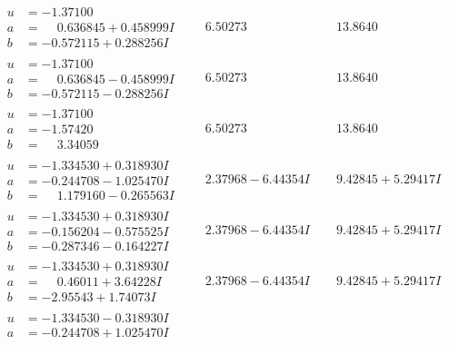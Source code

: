 \documentclass[1p]{elsarticle_modified}
\theoremstyle{definition}
\begin{document}
$$\begin{array}{c|c|c}
\begin{aligned}
u &= -1.37100\phantom{ +0.000000I} \\
a &= \phantom{-}0.636845 + 0.458999 I \\
b &= -0.572115 + 0.288256 I\end{aligned}
 & \phantom{-}6.50273\phantom{ +0.000000I} & \phantom{-}13.8640\phantom{ +0.000000I} \\ \hline\begin{aligned}
u &= -1.37100\phantom{ +0.000000I} \\
a &= \phantom{-}0.636845 - 0.458999 I \\
b &= -0.572115 - 0.288256 I\end{aligned}
 & \phantom{-}6.50273\phantom{ +0.000000I} & \phantom{-}13.8640\phantom{ +0.000000I} \\ \hline\begin{aligned}
u &= -1.37100\phantom{ +0.000000I} \\
a &= -1.57420\phantom{ +0.000000I} \\
b &= \phantom{-}3.34059\phantom{ +0.000000I}\end{aligned}
 & \phantom{-}6.50273\phantom{ +0.000000I} & \phantom{-}13.8640\phantom{ +0.000000I} \\ \hline\begin{aligned}
u &= -1.334530 + 0.318930 I \\
a &= -0.244708 - 1.025470 I \\
b &= \phantom{-}1.179160 - 0.265563 I\end{aligned}
 & \phantom{-}2.37968 - 6.44354 I & \phantom{-}9.42845 + 5.29417 I \\ \hline\begin{aligned}
u &= -1.334530 + 0.318930 I \\
a &= -0.156204 - 0.575525 I \\
b &= -0.287346 - 0.164227 I\end{aligned}
 & \phantom{-}2.37968 - 6.44354 I & \phantom{-}9.42845 + 5.29417 I \\ \hline\begin{aligned}
u &= -1.334530 + 0.318930 I \\
a &= \phantom{-}0.46011 + 3.64228 I \\
b &= -2.95543 + 1.74073 I\end{aligned}
 & \phantom{-}2.37968 - 6.44354 I & \phantom{-}9.42845 + 5.29417 I \\ \hline\begin{aligned}
u &= -1.334530 - 0.318930 I \\
a &= -0.244708 + 1.025470 I \\

\end{aligned}
\end{array}$$
\end{document}
